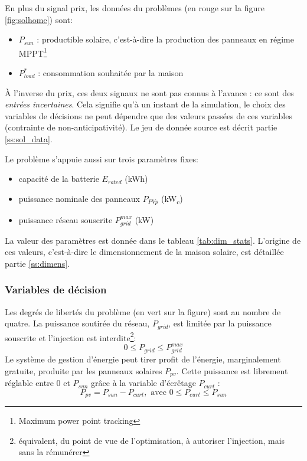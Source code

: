 \documentclass[a4paper,10pt,twocolumn]{article}
\newcommand\sub[1]{\textsubscript{#1}}
\newcommand\kWc{kW\sub{c}{}} %
\begin{document}
En plus du signal prix, les données du problèmes (en rouge sur la figure \ref{fig:solhome}) sont:

\begin{itemize}
 \item $P_{sun}$ : productible solaire, c'est-à-dire la production des panneaux en régime
MPPT\footnote{Maximum power point tracking}
 \item $P_{load}^*$ : consommation souhaitée par la maison
\end{itemize}

À l'inverse du prix, ces deux signaux ne sont pas connus à l'avance :
ce sont des \emph{entrées incertaines}.
Cela signifie qu'à un instant de la simulation, le choix des variables
de décisions ne peut dépendre que des valeurs passées de ces variables
(contrainte de non-anticipativité).
Le jeu de donnée source est décrit partie \ref{ss:sol_data}.

Le problème s'appuie aussi sur trois paramètres fixes:
\begin{itemize}
 \item capacité de la batterie $E_{rated}$ (kWh)
 \item puissance nominale des panneaux $P_{PVp}$ (\kWc)
 \item puissance réseau souscrite $P_{grid}^{max}$ (kW)
\end{itemize}

La valeur des paramètres est donnée dans le tableau \ref{tab:dim_stats}.
L'origine de ces valeurs, c'est-à-dire le dimensionnement de la maison solaire,
est détaillée partie \ref{ss:dimens}.

\subsubsection{Variables de décision}
\label{sss:opti_var}

Les degrés de libertés du problème (en vert sur la figure) sont au nombre de quatre.
La puissance soutirée du réseau, $P_{grid}$,
est limitée par la puissance souscrite
et l'injection est interdite\footnote{
équivalent, du point de vue de l'optimisation, à autoriser l'injection, mais sans la rémunérer}:
%
\begin{equation}
  0 \leq P_{grid} \leq P_{grid}^{max}
\end{equation}
%
Le système de gestion d'énergie peut tirer profit de l'énergie, marginalement
gratuite, produite par les panneaux solaires $P_{pv}$.
Cette puissance est librement réglable entre 0 et $P_{sun}$ grâce à la variable
d'écrêtage $P_{curt}$ :
%
\begin{equation}
  P_{pv} = P_{sun} - P_{curt}, \text{ avec } 0 \leq P_{curt} \leq P_{sun}
\end{equation}
\end{document}
